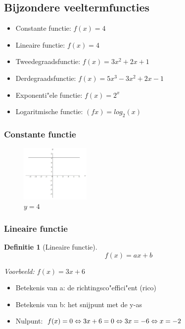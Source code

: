 \documentclass{article}
\newtheorem{theorem}{Definitie}[section]
\begin{document}
\subsection{Bijzondere veeltermfuncties}

\begin{itemize}
    \item Constante functie: $f(x) = 4$
    \item Lineaire functie: $f(x) = 4$
    \item Tweedegraadsfunctie: $f(x) = 3x^2 + 2x + 1$
    \item Derdegraadsfunctie: $f(x) = 5x^3 - 3x^2 + 2x - 1$
    \item Exponenti"ele functie: $f(x) = 2^x$
    \item Logaritmische functie: $(fx) = log_2(x)$
\end{itemize}

\subsubsection{Constante functie}

\begin{figure}[H]
    \centering
    \includegraphics[width=0.3\textwidth]{functie-constant.png}
    \caption{$y=4$}
\end{figure}

\subsubsection{Lineaire functie}

\begin{theorem}[Lineaire functie]
    \begin{equation}
        f(x) = ax + b
    \end{equation}


Voorbeeld: $f(x) = 3x + 6$
\end{theorem}

\begin{itemize}
    \item Betekenis van a: de richtingsco"effici"ent (rico)
    \item Betekenis van b: het snijpunt met de y-as
    \item Nulpunt: $f(x) = 0 \\ \Leftrightarrow 3x + 6 = 0 \\ \Leftrightarrow 3x = -6  \\ \Leftrightarrow x = -2$
\end{itemize}
\end{document}
